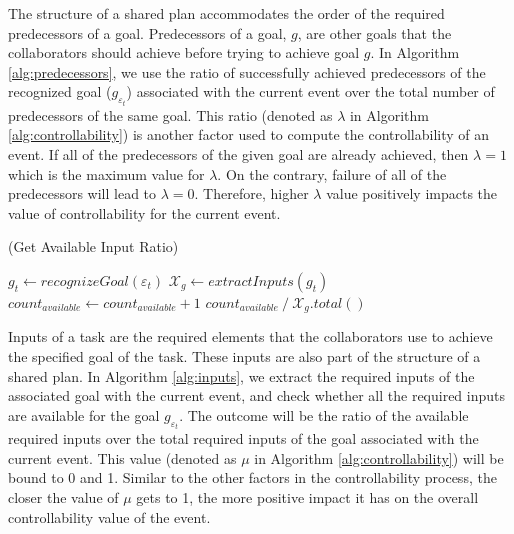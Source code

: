 \documentclass{aamas2016}
\begin{document}
The structure of a shared plan accommodates the order of the required
predecessors of a goal. Predecessors of a goal, $g$, are other goals that
the collaborators should achieve before trying to achieve goal $g$. In Algorithm
\ref{alg:predecessors}, we use the ratio of successfully achieved predecessors
of the recognized goal ($\mathit{g}_{\varepsilon_t}$) associated with the
current event over the total number of predecessors of the same goal. This ratio
(denoted as $\lambda$ in Algorithm \ref{alg:controllability}) is another factor
used to compute the controllability of an event. If all of the predecessors of
the given goal are already achieved, then $\lambda=1$ which is the maximum value
for $\lambda$. On the contrary, failure of all of the predecessors will lead to
$\lambda=0$. Therefore, higher $\lambda$ value positively impacts the value of
controllability for the current event.

\renewcommand\thealgorithm{4\alph{algorithm}}
\setcounter{algorithm}{3}

\begin{algorithm}
	\caption{(Get Available Input Ratio)}
	\label{alg:inputs}
	\begin{algorithmic}[1]
			\Statex
			\State $\mathit{g}_{t} \gets \textit{recognizeGoal}{(\varepsilon_t)}$
			\Statex
			\State $\mathcal{X}_{\mathit{g}} \gets
			\textit{extractInputs}{(\mathit{g}_{t})}$
			\Statex
					\State $count_{available} \gets count_{available} + 1$
				\EndIf
			\EndFor
			\Statex
			\State \Return
			${count_{available} \mathbin{/} \mathcal{X}_{\mathit{g}}.total()}$
		\EndFunction 
	\end{algorithmic}
\end{algorithm}

Inputs of a task are the required elements that the collaborators use to
achieve the specified goal of the task. These inputs are also part of the
structure of a shared plan. In Algorithm \ref{alg:inputs}, we extract the
required inputs of the associated goal with the current event, and check whether
all the required inputs are available for the goal $\mathit{g}_{\varepsilon_t}$.
The outcome will be the ratio of the available required inputs over the total
required inputs of the goal associated with the current event. This value
(denoted as $\mu$ in Algorithm \ref{alg:controllability}) will be bound to 0 and
1. Similar to the other factors in the controllability process, the closer the
value of $\mu$ gets to 1, the more positive impact it has on the overall
controllability value of the event.
\end{document}
